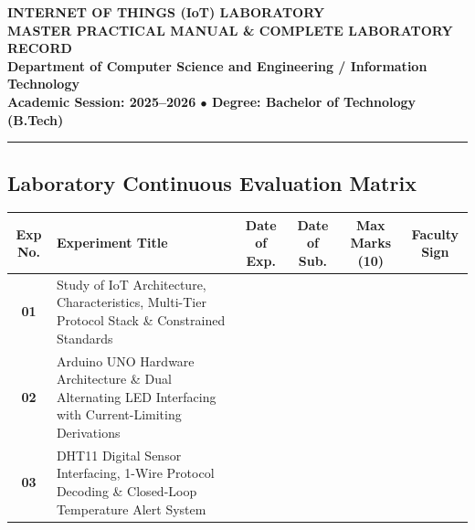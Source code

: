 \documentclass[11pt,a4paper]{article}
\begin{document}
\begin{center}
    {\LARGE\bfseries INTERNET OF THINGS (IoT) LABORATORY}\\[0.15cm]
    {\large\bfseries MASTER PRACTICAL MANUAL \& COMPLETE LABORATORY RECORD}\\[0.20cm]
    {\normalsize\textbf{Department of Computer Science and Engineering / Information Technology}}\\[0.08cm]
    {\footnotesize\textbf{Academic Session: 2025--2026 \quad $\bullet$ \quad Degree: Bachelor of Technology (B.Tech)}}
\end{center}
\vspace{-0.2cm}
\rule{\textwidth}{1.2pt}
\vspace{0.25cm}

\subsection*{Laboratory Continuous Evaluation Matrix}
\begin{center}
\small
\renewcommand{\arraystretch}{1.25}
\begin{tabularx}{\textwidth}{|c|X|c|c|c|c|}
\hline
\textbf{Exp No.} & \textbf{Experiment Title} & \textbf{Date of Exp.} & \textbf{Date of Sub.} & \textbf{Max Marks (10)} & \textbf{Faculty Sign} \\
\hline
\textbf{01} & Study of IoT Architecture, Characteristics, Multi-Tier Protocol Stack \& Constrained Standards & & & & \\
\hline
\textbf{02} & Arduino UNO Hardware Architecture \& Dual Alternating LED Interfacing with Current-Limiting Derivations & & & & \\
\hline
\textbf{03} & DHT11 Digital Sensor Interfacing, 1-Wire Protocol Decoding \& Closed-Loop Temperature Alert System & & & & \\
\hline
\end{tabularx}
\end{center}

\vspace{0.15cm}
\end{document}
